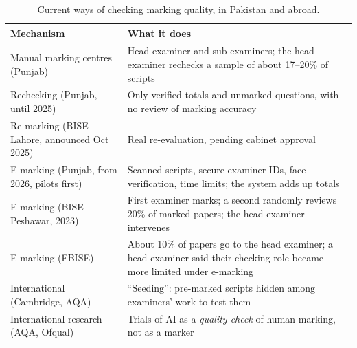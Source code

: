\begin{table}[H]
\centering
\caption{Current ways of checking marking quality, in Pakistan and abroad.}
\label{tab:current}
\begin{tabularx}{\linewidth}{@{}P{4.6cm}L@{}}
\toprule
\textbf{Mechanism} & \textbf{What it does} \\
\midrule
Manual marking centres (Punjab) & Head examiner and sub-examiners; the head examiner rechecks a sample of about 17--20\% of
  scripts \citep{bisemultan,ilmkidunya2026} \\
Rechecking (Punjab, until 2025) & Only verified totals and unmarked questions, with no review of marking accuracy
  \citep{techjuice2025remark} \\
Re-marking (BISE Lahore, announced Oct 2025) & Real re-evaluation, pending cabinet approval \citep{propk2025remark} \\
E-marking (Punjab, from 2026, pilots first) & Scanned scripts, secure examiner IDs, face verification, time limits; the
  system adds up totals \citep{dawn2025digitisation,tribune2026online} \\
E-marking (BISE Peshawar, 2023) & First examiner marks; a second randomly reviews 20\% of marked papers; the head
  examiner intervenes \citep{dawn2023peshawar} \\
E-marking (FBISE) & About 10\% of papers go to the head examiner; a head examiner said their checking role became more limited
  under e-marking \citep{dawn2023fbise} \\
International (Cambridge, AQA) & ``Seeding'': pre-marked scripts hidden among examiners' work to test them
  \citep{cambridgeqa,ofqual2018} \\
International research (AQA, Ofqual) & Trials of AI as a \emph{quality check} of human marking, not as a marker
  \citep{tes2024aqa,kcl_aqa,ofqual2026} \\
\bottomrule
\end{tabularx}
\end{table}

